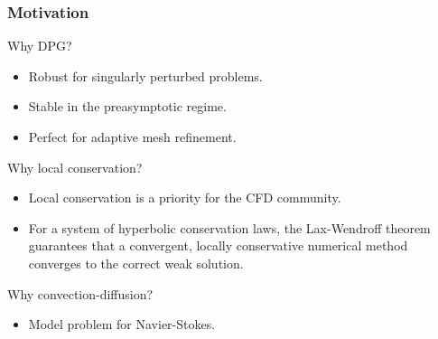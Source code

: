  \begin{frame}
 \frametitle{Motivation}
 Why DPG?
 \begin{itemize}
 \item Robust for singularly perturbed problems.
 \item Stable in the preasymptotic regime.
 \item Perfect for adaptive mesh refinement.
 \end{itemize}
 \bigskip
 
 Why local conservation?
 \begin{itemize}
 \item Local conservation is a priority for the CFD community.
 \item For a system of hyperbolic conservation laws, the Lax-Wendroff theorem
 guarantees that a convergent, locally conservative numerical method converges
 to the correct weak solution.
 \end{itemize}
 \bigskip
 
 Why convection-diffusion?
 \begin{itemize}
 \item Model problem for Navier-Stokes.
 \end{itemize}
 \end{frame}
 \begin{comment}
 Hopefully Nate and Jesse's talks explained some of the attractions of
 developing the discontinuous Petrov-Galkerin method for fluid problems, but
 here are a couple key points.
 DPG has proved robust in the face of singularly perturbed problems which holds
 promise for high Reynold's number flows.
 You do not need a domain expert to craft well designed meshes for each new
 problem. We are mathematically guaranteed to remain stable under very coarse
 meshes while adaptively refining toward a solution.
 
 But if we are concerned with realistic flows, why are we worried about local
 conservation in the convection-diffusion equation. First of all, in order for
 DPG to be accepted by the CFD community, we need to pacify some of their
 concerns about local conservation - a very weighty issue among CFD
 practitioners. There are also some attractive reasons, mathematically to
 develop a locally conservative method, such as the Lax-Wendroff theorem which
 uses local conservation as one of two conditions to guarantee that a numerical
 solution converges to the weak solution of a system of hyperbolic conservation
 laws. But before we jump in and start trying to enforce local conservation in
 our solutions to the Navier-Stokes equations, we are starting with something a
 little simpler, the convection-diffusion equation.
 \end{comment}
 
